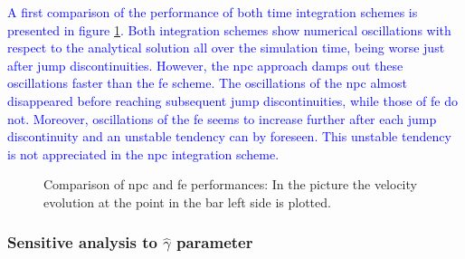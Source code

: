 \documentclass[preprint,12pt,a4paper]{elsarticle}
\begin{document}
\textcolor{blue}{A first comparison of the performance of both time integration schemes is presented in figure \ref{fig:Dyka-NPC-FE}. Both integration schemes show numerical oscillations with respect to the analytical solution all over the simulation time, being worse just after jump discontinuities. However, the \acrshort{npc} approach damps out these oscillations faster than the \acrshort{fe} scheme. The oscillations of the \acrshort{npc} almost disappeared before reaching subsequent jump discontinuities, while those of \acrshort{fe} do not. Moreover, oscillations of the \acrshort{fe} seems to increase further after each jump discontinuity and an unstable tendency can by foreseen. This unstable tendency is not appreciated in the \acrshort{npc} integration scheme.} 
\begin{figure}
  \centering
  \caption{Comparison of \acrshort{npc} and \acrshort{fe}
      performances: In the picture the velocity evolution at the point in the bar left side
    is plotted.}
  \label{fig:Dyka-NPC-FE}
\end{figure}

\subsubsection{Sensitive analysis to $\widehat{\gamma}$ parameter}
\label{sec:Sensitive-analysis-gamma}
\end{document}
